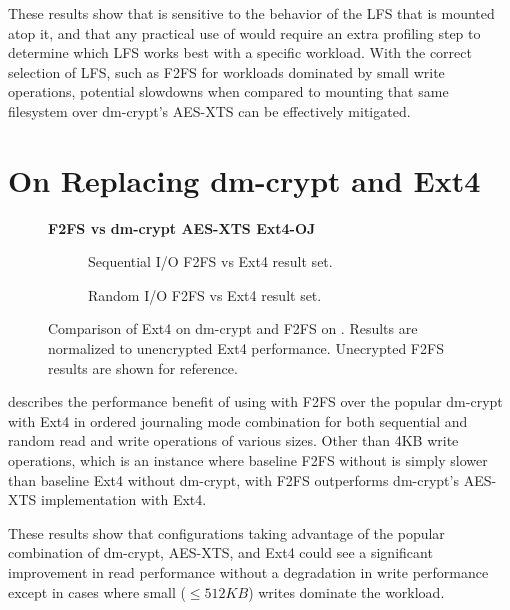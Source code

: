 These results show that \SYSTEM{} is sensitive to the behavior of the LFS that
is mounted atop it, and that any practical use of \SYSTEM{} would require an
extra profiling step to determine which LFS works best with a specific workload.
With the correct selection of LFS, such as F2FS for workloads dominated by small
write operations, potential slowdowns when compared to mounting that same
filesystem over dm-crypt's AES-XTS can be effectively mitigated.


\section{On Replacing dm-crypt and Ext4}

\begin{figure*}[t]
    \textbf{\SYSTEM{} F2FS vs dm-crypt AES-XTS Ext4-OJ}\par\medskip
    \centering
    \hspace*{-2.5em}
    \begin{subfigure}{0.525\linewidth}
        \centering
        {}
        \caption{Sequential I/O F2FS vs Ext4 result set.}
        \label{fig:microbench-ext4-sequential}
    \end{subfigure}\hspace*{2.5em}%
    \begin{subfigure}{0.525\linewidth}
        \centering
        \vspace{3em}
        {}
        \caption{Random I/O F2FS vs Ext4 result set.}
        \label{fig:microbench-ext4-random}
    \end{subfigure}
    \caption{ Comparison of Ext4 on dm-crypt and F2FS on \SYSTEM{}.
      Results are normalized to unencrypted Ext4 performance.
      Unecrypted F2FS results are shown for reference.}
    \label{fig:microbench-ext4}
\end{figure*}

 describes the performance benefit of using \SYSTEM{}
with F2FS over the popular dm-crypt with Ext4 in ordered journaling mode
combination for both sequential and random read and write operations of various
sizes. Other than 4KB write operations, which is an instance where baseline F2FS
without \SYSTEM{} is simply slower than baseline Ext4 without dm-crypt,
\SYSTEM{} with F2FS outperforms dm-crypt's AES-XTS implementation with Ext4.

These results show that configurations taking advantage of the popular
combination of dm-crypt, AES-XTS, and Ext4 could see a significant improvement
in read performance without a degradation in write performance except in cases
where small ($\leq512KB$) writes dominate the workload.

